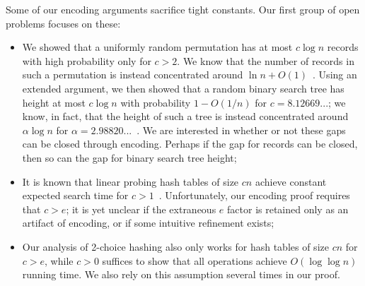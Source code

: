 Some of our encoding arguments sacrifice tight constants. Our first
group of open problems focuses on these:
\begin{itemize}

\item We showed that a uniformly random permutation has at most $c
  \log n$ records with high probability only for $c > 2$. We know that
  the number of records in such a permutation is instead concentrated
  around $\ln n + O(1)$~\cite{devroye:records}. Using an extended
  argument, we then showed that a random binary search tree has height
  at most $c \log n$ with probability $1 - O(1/n)$ for $c =
  8.12669...$; we know, in fact, that the height of such a tree is
  instead concentrated around $\alpha \log n$ for $\alpha =
  2.98820...$~\cite{reed:height}. We are interested in whether or not
  these gaps can be closed through encoding. Perhaps if the gap for
  records can be closed, then so can the gap for binary search tree
  height;

\item It is known that linear probing hash tables of size $cn$ achieve
  constant expected search time for $c > 1$~\cite{morin:open}.
  Unfortunately, our encoding proof requires that $c > e$; it is yet
  unclear if the extraneous $e$ factor is retained only as an artifact
  of encoding, or if some intuitive refinement exists;

\item Our analysis of 2-choice hashing also only works for hash tables
  of size $cn$ for $c > e$, while $c > 0$ suffices to show that all
  operations achieve $O(\log \log n)$ running time. We also rely on
  this assumption several times in our proof.
\end{itemize}

